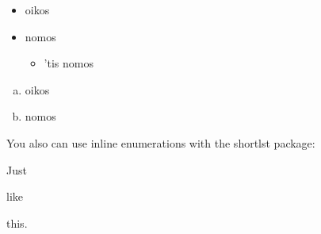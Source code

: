 \documentclass[11pt]{article}			%
\begin{document}
\newpage

\begin{itemize}
	\item
	oikos
	\item
	nomos
	\begin{itemize}
		\item
		'tis nomos
	\end{itemize}
\end{itemize}

\hspace*{2em}

\begin{enumerate}[(a)]
	\item
	oikos
	\item
	nomos
\end{enumerate}

You also can use inline enumerations with the shortlst package:

\begin{runenumerate}
	\item
	Just
	\item
	like
	\item
	\hfill this.
\end{runenumerate}
\end{document}
